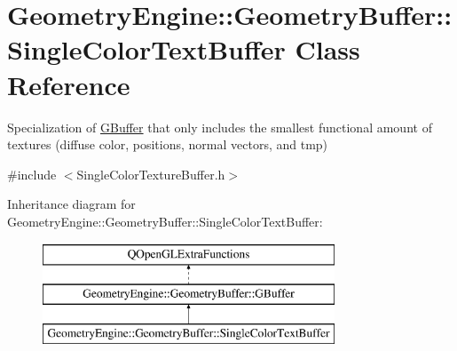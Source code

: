 \hypertarget{class_geometry_engine_1_1_geometry_buffer_1_1_single_color_text_buffer}{}\section{Geometry\+Engine\+::Geometry\+Buffer\+::Single\+Color\+Text\+Buffer Class Reference}
\label{class_geometry_engine_1_1_geometry_buffer_1_1_single_color_text_buffer}


Specialization of \mbox{\hyperlink{class_geometry_engine_1_1_geometry_buffer_1_1_g_buffer}{G\+Buffer}} that only includes the smallest functional amount of textures (diffuse color, positions, normal vectors, and tmp)  




{\ttfamily \#include $<$Single\+Color\+Texture\+Buffer.\+h$>$}

Inheritance diagram for Geometry\+Engine\+::Geometry\+Buffer\+::Single\+Color\+Text\+Buffer\+:\begin{figure}[H]
\begin{center}
\leavevmode
\includegraphics[height=3.000000cm]{class_geometry_engine_1_1_geometry_buffer_1_1_single_color_text_buffer}
\end{center}
\end{figure}
